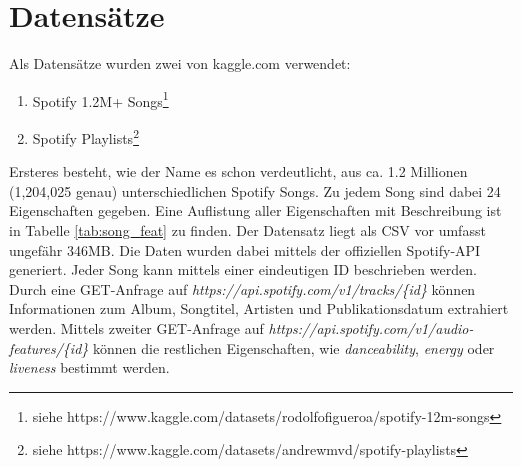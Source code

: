 \documentclass[conference]{IEEEtran}
\begin{document}
\section{Datensätze}

Als Datensätze wurden zwei von kaggle.com verwendet:
\begin{enumerate}
    \item Spotify 1.2M+ Songs\footnote{siehe https://www.kaggle.com/datasets/rodolfofigueroa/spotify-12m-songs}
    \item Spotify Playlists\footnote{siehe https://www.kaggle.com/datasets/andrewmvd/spotify-playlists}
\end{enumerate}
Ersteres besteht, wie der Name es schon verdeutlicht, aus ca. 1.2 Millionen (1,204,025 genau) unterschiedlichen Spotify Songs. Zu jedem Song sind dabei 24 Eigenschaften gegeben. Eine Auflistung aller Eigenschaften mit Beschreibung ist in Tabelle \eqref{tab:song_feat} zu finden. Der Datensatz liegt als CSV vor umfasst ungefähr 346MB. Die Daten wurden dabei mittels der offiziellen Spotify-API generiert. Jeder Song kann mittels einer eindeutigen ID beschrieben werden. Durch eine GET-Anfrage auf \textit{https://api.spotify.com/v1/tracks/\{id\}} können Informationen zum Album, Songtitel, Artisten und Publikationsdatum extrahiert werden. Mittels zweiter GET-Anfrage auf \textit{https://api.spotify.com/v1/audio-features/\{id\}} können die restlichen Eigenschaften, wie \textit{danceability}, \textit{energy} oder \textit{liveness} bestimmt werden.
\end{document}
